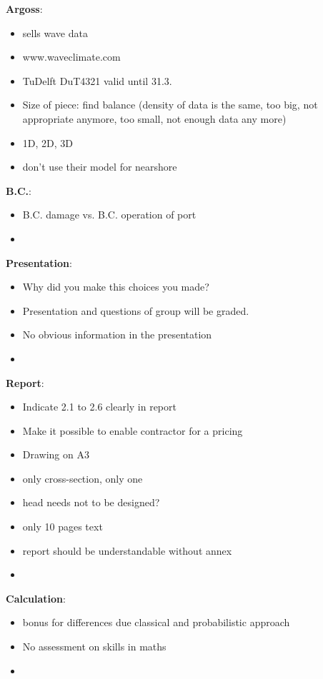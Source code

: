 \textbf{Argoss}:
\begin{itemize}
 \item sells  wave data
 \item www.waveclimate.com
 \item TuDelft DuT4321 valid until 31.3.
 \item Size of piece: find balance (density of data is the same, too big, not appropriate anymore, too small, not enough data any more)
 \item 1D, 2D, 3D
 \item don't use their model for nearshore
\end{itemize}

\textbf{B.C.}:
\begin{itemize}
 \item B.C. damage vs. B.C. operation of port
 \item 
\end{itemize}

\textbf{Presentation}:
\begin{itemize}
 \item Why did you make this choices you made?
 \item Presentation and questions of group will be graded.
 \item No obvious information in the presentation
 \item 
\end{itemize}

\textbf{Report}:
\begin{itemize}
 \item Indicate 2.1 to 2.6 clearly in report
 \item Make it possible to enable contractor for a pricing
 \item Drawing on A3
 \item only cross-section, only one
 \item head needs not to be designed?
 \item only 10 pages text
 \item report should be understandable without annex
 \item 
\end{itemize}

\textbf{Calculation}:
\begin{itemize}
 \item bonus for differences due classical and probabilistic approach
 \item No assessment on skills in maths
 \item 
\end{itemize}

